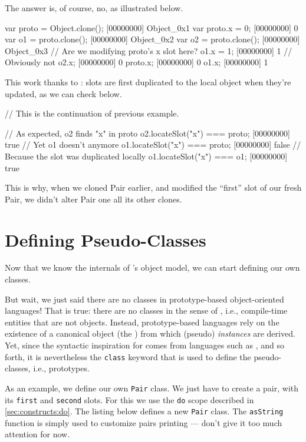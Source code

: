 The answer is, of course, no, as illustrated below.

\begin{urbiscript}[firstnumber=1]
var proto = Object.clone();
[00000000] Object_0x1
var proto.x = 0;
[00000000] 0
var o1 = proto.clone();
[00000000] Object_0x2
var o2 = proto.clone();
[00000000] Object_0x3
// Are we modifying proto's x slot here?
o1.x = 1;
[00000000] 1
// Obviously not
o2.x;
[00000000] 0
proto.x;
[00000000] 0
o1.x;
[00000000] 1
\end{urbiscript}

This work thanks to : slots are first duplicated to the
local object when they're updated, as we can check below.

\begin{urbiscript}
// This is the continuation of previous example.

// As expected, o2 finds "x" in proto
o2.locateSlot("x") === proto;
[00000000] true
// Yet o1 doesn't anymore
o1.locateSlot("x") === proto;
[00000000] false
// Because the slot was duplicated locally
o1.locateSlot("x") === o1;
[00000000] true
\end{urbiscript}

This is why, when we cloned Pair earlier, and modified the ``first'' slot of
our fresh Pair, we didn't alter Pair one all its other clones.

\section{Defining Pseudo-Classes}
\label{sec:tut:class}

Now that we know the internals of \us's object model, we can start defining
our own classes.

But wait, we just said there are no classes in prototype-based
object-oriented languages!  That is true: there are no classes in the sense
of \Cxx, i.e., compile-time entities that are not objects.  Instead,
prototype-based languages rely on the existence of a canonical object (the
) from which (pseudo) \emph{instances} are derived.  Yet,
since the syntactic inspiration for \us comes from languages such as \Java,
\Cxx and so forth, it is nevertheless the \lstinline|class| keyword that is
used to define the pseudo-classes, i.e., prototypes.

As an example, we define our own \lstinline{Pair} class. We just have to
create a pair, with its \lstinline|first| and \lstinline|second| slots. For
this we use the \lstinline{do} scope described in
\autoref{sec:constructs:do}. The listing below defines a new
\lstinline{Pair} class. The \lstinline{asString} function is simply used to
customize pairs printing --- don't give it too much attention for now.

